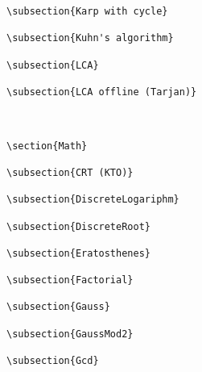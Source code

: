 {\begin{verbatim}
\subsection{Karp with cycle}

\subsection{Kuhn's algorithm}

\subsection{LCA}

\subsection{LCA offline (Tarjan)}



\section{Math}

\subsection{CRT (KTO)}

\subsection{DiscreteLogariphm}

\subsection{DiscreteRoot}

\subsection{Eratosthenes}

\subsection{Factorial}

\subsection{Gauss}

\subsection{GaussMod2}

\subsection{Gcd}


\end{verbatim}}
